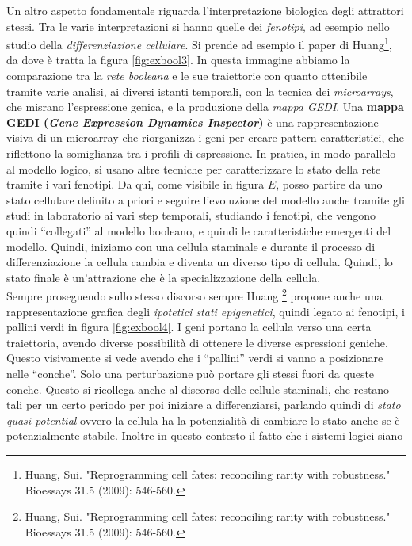 \documentclass[a4paper,12pt, oneside]{book}
\begin{document}
Un altro aspetto fondamentale riguarda l'interpretazione biologica degli
attrattori stessi. Tra le varie interpretazioni si hanno quelle dei
\textit{fenotipi}, ad esempio nello studio della \textit{differenziazione
  cellulare}. Si prende ad esempio il paper di Huang\footnote{Huang,
  Sui. "Reprogramming cell fates: reconciling rarity with robustness." Bioessays
  31.5 (2009): 546-560.}, da dove è tratta la figura \ref{fig:exbool3}. In
questa immagine abbiamo la comparazione tra la \textit{rete booleana} e le sue
traiettorie con quanto ottenibile tramite varie analisi, ai diversi istanti
temporali, con la tecnica dei \textit{microarrays}, che misrano l'espressione
genica, e la produzione della
\textit{mappa GEDI}. Una \textbf{mappa GEDI (\textit{Gene Expression Dynamics
    Inspector})} è una 
rappresentazione visiva di un microarray che riorganizza i geni per creare
pattern caratteristici, che riflettono la somiglianza tra i profili di
espressione. In pratica, in modo parallelo al modello logico, si usano altre
tecniche per caratterizzare lo stato della rete tramite i vari fenotipi. Da qui,
come visibile in figura $E$, posso partire da uno stato cellulare definito a
priori e seguire l'evoluzione del modello anche tramite gli studi in laboratorio
ai vari step temporali, studiando i fenotipi, che vengono quindi ``collegati''
al modello booleano, e quindi le caratteristiche emergenti del modello. Quindi,
iniziamo con una cellula staminale e durante il processo di differenziazione la
cellula cambia e diventa un diverso tipo di cellula. Quindi, lo stato finale è
un'attrazione che è la specializzazione della cellula.  \\
Sempre proseguendo sullo stesso discorso sempre Huang \footnote{Huang,
  Sui. "Reprogramming cell fates: reconciling rarity with robustness." Bioessays
  31.5 (2009): 546-560.} propone anche una rappresentazione grafica degli
\textit{ipotetici stati epigenetici}, quindi legato ai fenotipi, i pallini verdi
in figura \ref{fig:exbool4}. I geni portano la cellula verso una certa
traiettoria, avendo diverse possibilità di ottenere le diverse espressioni
geniche. Questo visivamente si vede avendo che i ``pallini'' verdi si vanno a
posizionare nelle ``conche''. Solo una perturbazione può portare gli stessi
fuori da queste conche. Questo si ricollega anche al discorso delle cellule
staminali, che restano tali per un certo periodo per poi iniziare a
differenziarsi, parlando quindi di \textit{stato quasi-potential} ovvero la
cellula ha la potenzialità di cambiare lo stato anche se è potenzialmente
stabile. Inoltre in questo contesto il fatto che i sistemi logici siano
\end{document}
